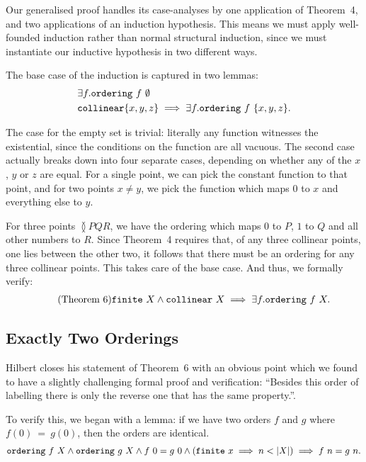 Our generalised proof handles its case-analyses by one application of Theorem~4, and two applications of an induction hypothesis. This means we must apply well-founded induction rather than normal structural induction, since we must instantiate our inductive hypothesis in two different ways. 

The base case of the induction is captured in two lemmas:
\begin{displaymath}
  \begin{aligned}
    &\exists f. \code{ordering}\ f\ \emptyset\\
    &\code{collinear} \{x,y,z\} \implies \exists f. \code{ordering}\ f\ \{x,y,z\}.
  \end{aligned}
\end{displaymath}

The case for the empty set is trivial: literally any function witnesses the existential, since the conditions on the function are all vacuous. The second case actually breaks down into four separate cases, depending on whether any of the $x$, $y$ or $z$ are equal. For a single point, we can pick the constant function to that point, and for two points $x \neq y$, we pick the function which maps $0$ to $x$ and everything else to $y$.

For three points $\between{P}{Q}{R}$, we have the ordering which maps $0$ to $P$, $1$ to $Q$ and all other numbers to $R$. Since Theorem~4 requires that, of any three collinear points, one lies between the other two, it follows that there must be an ordering for any three collinear points. This takes care of the base case. And thus, we formally verify:
\begin{equation}
  \label{eq:six}
  \tag{Theorem~6}
  \begin{split}
    \texttt{finite}\ X \wedge \texttt{collinear}\ X \implies \exists f. \texttt{ordering}\ f\ X.
  \end{split}
\end{equation}

\subsection{Exactly Two Orderings}
Hilbert closes his statement of Theorem~6 with an obvious point which we found to have a slightly challenging formal proof and verification: ``Besides this order of labelling there is only the reverse one that has the same property.''.

To verify this, we began with a lemma: if we have two orders $f$ and $g$ where\linebreak $f(0)~=~g(0)$, then the orders are identical. 
\begin{multline}
  \texttt{ordering}\ f\ X \wedge \texttt{ordering}\ g\ X \wedge f\ 0 = g\ 0
  \wedge (\texttt{finite}\ x \implies n < |X|) \implies f\ n = g\ n.
\end{multline}

